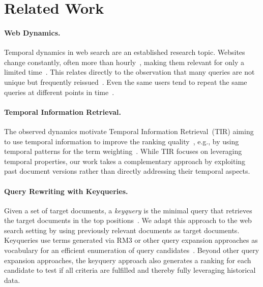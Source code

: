 \section{Related Work}
\label{sec:related-work}

\paragraph{Web Dynamics.} Temporal dynamics in web search are an established research topic. Websites change constantly, often more than hourly~\cite{DBLP:conf/wsdm/AdarTDE09}, making them relevant for only a limited time~\cite{DBLP:conf/sigir/TikhonovBBOKG13}. This relates directly to the observation that many queries are not unique but frequently reissued~\cite{DBLP:conf/sigir/Dumais14,DBLP:journals/sigir/SilversteinHMM99}. Even the same users tend to repeat the same queries at different points in time~\cite{DBLP:conf/wsdm/TylerT10}.

\paragraph{Temporal Information Retrieval.} The observed dynamics motivate Temporal Information Retrieval~(TIR) aiming to use temporal information to improve the ranking quality~\cite{DBLP:journals/ftir/KanhabuaBN15,DBLP:journals/csur/CamposDJJ14}, e.g., by using temporal patterns for the term weighting~\cite{DBLP:conf/wsdm/ElsasD10}. While TIR focuses on leveraging temporal properties, our work takes a complementary approach by exploiting past document versions rather than directly addressing their temporal aspects.

\paragraph{Query Rewriting with Keyqueries.} Given a set of target documents, a \emph{keyquery} is the minimal query that retrieves the target documents in the top positions~\cite{gollub:2013a,hagen:2016b}. We adapt this approach to the web search setting by using previously relevant documents as target documents. Keyqueries use terms generated via RM3 or other query expansion approaches as vocabulary for an efficient enumeration of query candidates~\cite{froebe:2022c,froebe:2021c}. Beyond other query expansion approaches, the keyquery approach also generates a ranking for each candidate to test if all criteria are fulfilled and thereby fully leveraging historical data. 

